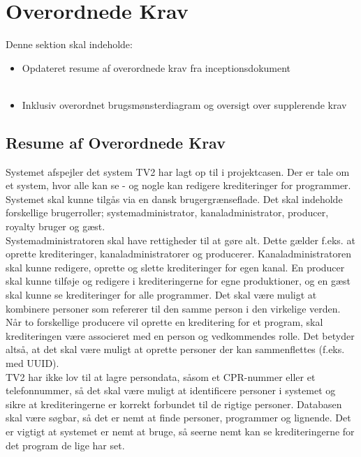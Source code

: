 \section{Overordnede Krav}
Denne sektion skal indeholde:

\begin{itemize}
    \item Opdateret resume af overordnede krav fra inceptionsdokument\\
    \\
    \item Inklusiv overordnet brugsmønsterdiagram og oversigt over supplerende krav
\end{itemize}{}

\subsection{Resume af Overordnede Krav} 

\noindent
Systemet afspejler det system TV2 har lagt op til i projektcasen. Der er tale om et system, hvor alle kan se - og nogle kan redigere krediteringer for programmer. Systemet skal kunne tilgås via en dansk brugergrænseflade. Det skal indeholde forskellige brugerroller; systemadministrator, kanaladministrator, producer, royalty bruger og gæst.\\

\noindent
Systemadministratoren skal have rettigheder til at gøre alt. Dette gælder f.eks. at oprette krediteringer, kanaladministratorer og producerer. Kanaladministratoren skal kunne redigere, oprette og slette krediteringer for egen kanal. En producer skal kunne tilføje og redigere i krediteringerne for egne produktioner, og en gæst skal kunne se krediteringer for alle programmer. 
Det skal være muligt at kombinere personer som refererer til den samme person i den virkelige verden. Når to forskellige producere vil oprette en kreditering for et program, skal krediteringen være associeret med en person og vedkommendes rolle. Det betyder altså, at det skal være muligt at oprette personer der kan sammenflettes (f.eks. med UUID).\\

\noindent
TV2 har ikke lov til at lagre persondata, såsom et CPR-nummer eller et telefonnummer, så det skal være muligt at identificere personer i systemet og sikre at krediteringerne er korrekt forbundet til de rigtige personer.
Databasen skal være søgbar, så det er nemt at finde personer, programmer og lignende. Det er vigtigt at systemet er nemt at bruge, så seerne nemt kan se krediteringerne for det program de lige har set.\\

